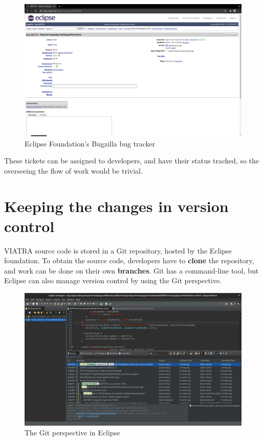 \documentclass[11pt,a4paper,oneside]{report}
\begin{document}
\begin{figure}[ht]
\centering
\includegraphics[width=150mm, keepaspectratio]{figures/bugzilla.png}
\caption{Eclipse Foundation's Bugzilla bug tracker}
\label{fig:bugzilla}
\end{figure}

These tickets can be assigned to developers, and have their status tracked, so
the overseeing the flow of work would be trivial.

\section{Keeping the changes in version control}
VIATRA source code is stored in a Git repository, hosted by the Eclipse
foundation. To obtain the source code, developers have to \textbf{clone} the
repository, and work can be done on their own \textbf{branches}. Git has a
command-line tool, but Eclipse can also manage version control by using the
Git perspective.

\begin{figure}[ht]
\centering
\includegraphics[width=150mm, keepaspectratio]{figures/eclipse-git.png}
\caption{The Git perspective in Eclipse}
\label{fig:eclipse-git}
\end{figure}
\end{document}
